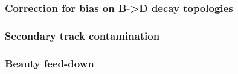 \subsubsection{Correction for bias on B->D decay topologies}


\subsubsection{Secondary track contamination}
 

\subsubsection{Beauty feed-down}

